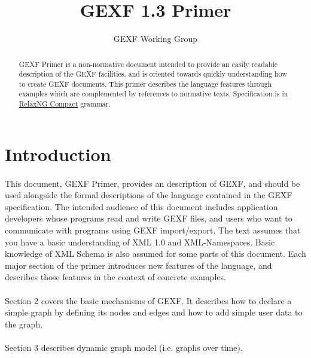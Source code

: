 \documentclass[a4paper,10pt]{article}
\title{GEXF 1.3 Primer}
\author{GEXF Working Group}
\begin{document}
\maketitle

\begin{abstract}
GEXF Primer is a non-normative document intended to provide an easily readable description of the GEXF facilities, and is oriented towards quickly understanding how to create GEXF documents. This primer describes the language features through examples which are complemented by references to normative texts. Specification is in \href{http://relaxng.org/compact-tutorial-20030326.html}{RelaxNG Compact} grammar.
\end{abstract}

\tableofcontents

\section{Introduction} \label{introduction}

\paragraph{}
This document, GEXF Primer, provides an description of GEXF, and should be used alongside the formal descriptions of the language contained in the GEXF specification. The intended audience of this document includes application developers whose programs read and write GEXF files, and users who want to communicate with programs using GEXF import/export. The text assumes that you have a basic understanding of XML 1.0 and  XML-Namespaces. Basic knowledge of XML Schema is also assumed for some parts of this document. Each major section of the primer introduces new features of the language, and describes those features in the context of concrete examples.

\paragraph{}
Section 2 covers the basic mechanisms of GEXF. It describes how to declare a simple graph by defining its nodes and edges and how to add simple user data to the graph.

\paragraph{}
Section 3 describes dynamic graph model (i.e. graphs over time).
\end{document}
